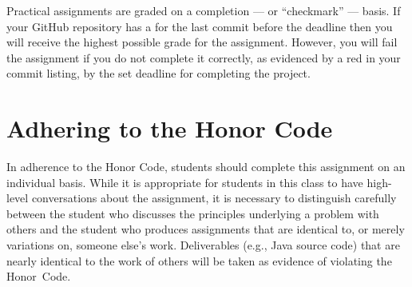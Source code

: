\documentclass[11pt]{article}
\newcommand{\checkmark}{\ding{51}}
\newcommand{\naughtmark}{\ding{55}}
\begin{document}
Practical assignments are graded on a completion --- or ``checkmark'' --- basis. If
your GitHub repository has a \checkmark{} for the last commit before the
deadline then you will receive the highest possible grade for the assignment.
However, you will fail the assignment if you do not complete it correctly, as
evidenced by a red \naughtmark{} in your commit listing, by the set deadline for
completing the project.

\section*{Adhering to the Honor Code}

In adherence to the Honor Code, students should complete this assignment on an
individual basis. While it is appropriate for students in this class to have
high-level conversations about the assignment, it is necessary to distinguish
carefully between the student who discusses the principles underlying a problem
with others and the student who produces assignments that are identical to, or
merely variations on, someone else's work. Deliverables (e.g., Java source code)
that are nearly identical to the work of others will be taken as evidence of
violating the \mbox{Honor Code}.

\end{document}
